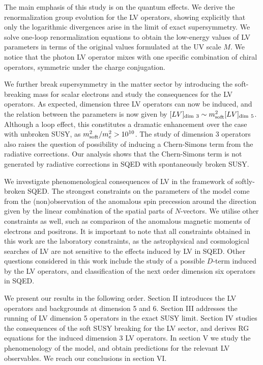 \documentclass[12pt]{revtex4}
\begin{document}
The main emphasis of this study is on the quantum effects. We derive the
renormalization group evolution for the LV operators, showing
explicitly that only the logarithmic divergences arise in the limit of
exact supersymmetry. We solve  one-loop renormalization equations
to obtain the low-energy values of LV parameters in terms of the
original values formulated at the UV scale $M$. We notice that the
photon LV operator mixes with one specific combination of  
chiral operators, symmetric under the charge conjugation. 

We further break supersymmetry in the matter sector by introducing the 
soft-breaking mass for scalar electrons and study the consequences for the 
LV operators. As expected, dimension three LV operators can now be induced, and the 
relation between the parameters is now given by 
$[LV]_{\rm dim~3} \sim m_{\rm soft}^2 [LV]_{\rm dim~5}$. 
Although a loop effect, this constitutes a dramatic enhancement over
the case with unbroken SUSY, as $ m_{\rm soft}^2/m_e^2 > 10^{10}$.  
The study of dimension 3 operators also raises the question of possibility of 
inducing  a Chern-Simons term from the radiative corrections.
Our analysis shows that the Chern-Simons term is not generated by 
radiative corrections in SQED with spontaneously broken SUSY.

We investigate phenomenological consequences of LV in the framework of
softly-broken SQED. The strongest constraints on the parameters of the
model come from the  (non)observation of the anomalous spin precession
around the direction given by the linear combination of the spatial
parts of $N$-vectors. We utilise other constraints as well,  
such as comparison of the anomalous magnetic moments of electrons and 
positrons. It is important to note that all constraints obtained in this 
work are the laboratory constraints, as the astrophysical and cosmological 
searches of LV are not sensitive to the effects induced by LV in SQED. 
Other questions considered in this work include the study of a possible $D$-term 
induced by the LV operators, and classification of the next order
dimension six operators in SQED. 

We present our results in the following order. Section II introduces
the LV operators and backgrounds at dimension 5 and 6.  Section III addresses the running of
LV dimension 5 operators in the exact SUSY limit. Section IV studies
the consequences of the soft SUSY breaking for the LV sector, and
derives RG equations for the induced dimension 3 LV operators.  In
section V we study the phenomenology of the model, and obtain 
predictions for the relevant LV observables. 
We reach our conclusions in section VI.  
\end{document}
